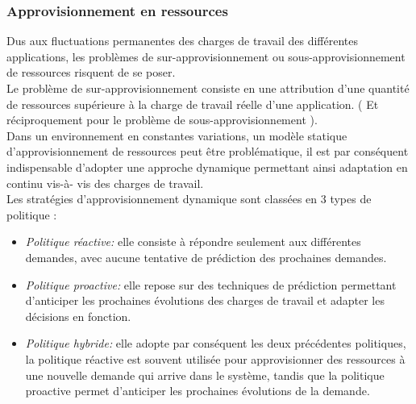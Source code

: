 \subsubsection{Approvisionnement en ressources}
Dus aux fluctuations permanentes des charges de travail des différentes applications, les problèmes de sur-approvisionnement ou sous-approvisionnement de  ressources risquent de se poser.\\
Le problème de sur-approvisionnement consiste en une attribution d’une quantité de ressources supérieure à la charge de travail réelle d’une application. ( Et réciproquement pour le problème de sous-approvisionnement ).\\
Dans un environnement en constantes variations,  un modèle statique d’approvisionnement de ressources peut être problématique, il est par conséquent indispensable d’adopter une approche dynamique permettant ainsi adaptation en continu vis-à- vis des charges de travail.\\ 
Les stratégies d’approvisionnement dynamique sont classées en 3 types de politique :
\begin{itemize}
  \item \emph{Politique réactive:} elle consiste à répondre seulement aux différentes demandes, avec aucune tentative de prédiction des prochaines demandes.
  \item \emph{Politique proactive:} elle repose sur des techniques de prédiction permettant d’anticiper les prochaines évolutions des charges de travail et adapter les décisions en fonction.
  \item \emph{Politique hybride:} elle adopte par conséquent les deux précédentes politiques,  la politique réactive est souvent utilisée pour approvisionner des ressources à une nouvelle demande qui arrive dans le système, tandis que la politique proactive permet d’anticiper les prochaines évolutions de la demande. 
\end{itemize}
